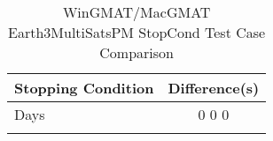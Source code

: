 \begin{table}[htbp!]
\centering
\caption{ WinGMAT/MacGMAT Earth3MultiSatsPM StopCond Test Case Comparison}
      \begin{tabular}{lc}
      \hline\hline
          Stopping Condition & Difference(s) \\
         \hline
         Days &  0 0 0 \\
      \hline\hline
      \label{Table: WinGMAT-MacGMAT Earth3MultiSatsPM StopCond Table} 
\end{tabular}
\end{table}
